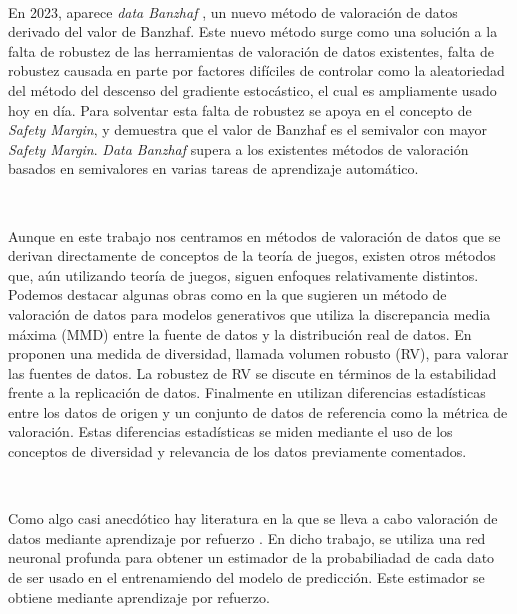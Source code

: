 \

En 2023, aparece \textit{data Banzhaf} \cite{dataBanzhaf},
un nuevo método de valoración de datos derivado del valor de Banzhaf.
Este nuevo método surge como una solución a la falta de robustez
de las herramientas de valoración de datos existentes, falta de
robustez causada en parte por factores difíciles de controlar como
la aleatoriedad del método del descenso del gradiente
estocástico, el cual es ampliamente usado hoy en día.
Para solventar esta falta de robustez se apoya en el
concepto de \textit{Safety Margin}, y demuestra que el valor de
Banzhaf es el semivalor con mayor \textit{Safety Margin}. 
\textit{Data Banzhaf} supera a los existentes métodos de valoración
basados en semivalores en varias tareas de aprendizaje automático.

\

Aunque en este trabajo nos centramos en
métodos de valoración de datos que se derivan directamente de
conceptos de la teoría de juegos, existen otros métodos
que, aún utilizando teoría de juegos, siguen enfoques relativamente
distintos. Podemos destacar algunas obras como \cite{tay} en la que
sugieren un método de valoración de datos para modelos
generativos que utiliza la discrepancia media máxima (MMD) entre
la fuente de datos y la distribución real de datos. En \cite{xu}
proponen una medida de diversidad, llamada volumen robusto (RV),
para valorar las fuentes de datos. La robustez de RV se discute
en términos de la estabilidad frente a la replicación de datos.
Finalmente en \cite{amiri} utilizan diferencias estadísticas
entre los datos de origen y un conjunto de datos de referencia
como la métrica de valoración. Estas diferencias estadísticas
se miden mediante el uso de los conceptos de diversidad y
relevancia de los datos previamente comentados.

\

Como algo casi anecdótico hay literatura en la que se lleva a
cabo valoración de datos mediante aprendizaje por refuerzo
\cite{reinforcement}. En dicho trabajo, se utiliza una red
neuronal profunda para obtener un estimador de la probabiliadad
de cada dato de ser usado en el entrenamiendo del modelo
de predicción. Este estimador se obtiene mediante aprendizaje
por refuerzo.
